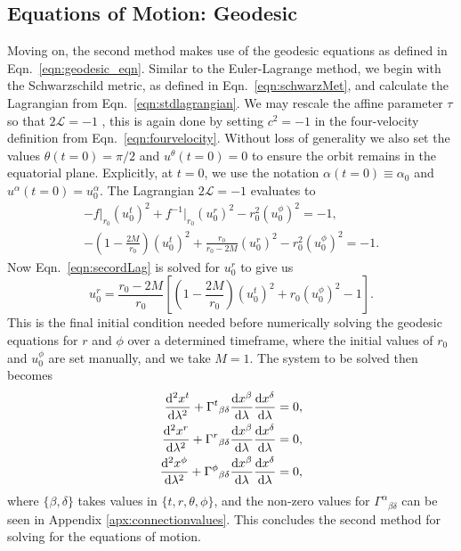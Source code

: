 
\subsection{Equations of Motion: Geodesic}
Moving on, the second method makes use of the geodesic equations as defined in Eqn.~\eqref{eqn:geodesic_eqn}.
Similar to the Euler-Lagrange method, we begin with the Schwarzschild metric, as defined in Eqn.~\eqref{eqn:schwarzMet}, and calculate the Lagrangian from Eqn.~\eqref{eqn:stdlagrangian}.
We may rescale the affine parameter $\tau$ so that $2\mathcal{L}=-1$ \cite{chandraBook}, this is again done by setting $c^2=-1$ in the four-velocity definition from Eqn.~\eqref{eqn:fourvelocity}.
Without loss of generality we also set the values $\theta(t=0)=\pi/2$ and $u^{\theta}(t=0)=0$ to ensure the orbit remains in the equatorial plane.
Explicitly, at $t=0$, we use the notation $\alpha(t=0)\equiv\alpha_0$ and $u^\alpha(t=0)=u_0^\alpha$. The Lagrangian $2\mathcal{L}=-1$ evaluates to
\begin{gather}
    -f\big\vert_{r_0}(u_0^t)^2+f^{-1}\big\vert_{r_0}(u_0^r)^2-r_0^2(u_0^\phi)^2=-1,\\
    -\left(1-\frac{2M}{r_0}\right)(u_0^t)^2 +\frac{r_0}{r_0-2M}(u_0^r)^2-r_0^2(u_0^\phi)^2=-1. \label{eqn:secordLag}
\end{gather}
Now Eqn.~\eqref{eqn:secordLag} is solved for $u_0^{r}$ to give us
\begin{equation}
u_0^r=\frac{r_0-2M}{r_0}\left[\left(1-\frac{2M}{r_0}\right)(u_0^t)^2+r_0(u_0^\phi)^2-1 \right].
\end{equation}
This is the final initial condition needed before numerically solving the geodesic equations for $r$ and $\phi$ over a determined timeframe, where the initial values of $r_0$ and $u_0^\phi$ are set manually, and we take $M=1$.
The system to be solved then becomes
\begin{align}
        \dv[2]{x^t}{\lambda}+\Gamma^{t}{}_{\beta\delta}\dv{x^\beta}{\lambda}\dv{x^\delta}{\lambda}=0,\\
        \dv[2]{x^r}{\lambda}+\Gamma^{r}{}_{\beta\delta}\dv{x^\beta}{\lambda}\dv{x^\delta}{\lambda}=0,\\
        \dv[2]{x^\phi}{\lambda}+\Gamma^{\phi}{}_{\beta\delta}\dv{x^\beta}{\lambda}\dv{x^\delta}{\lambda}=0,
\end{align}
where $\{\beta,\delta\}$ takes values in $\{t,r,\theta,\phi\}$, and the non-zero values for $\Gamma^\alpha{}_{\beta\delta}$ can be seen in Appendix \eqref{apx:connectionvalues}.
This concludes the second method for solving for the equations of motion. 

